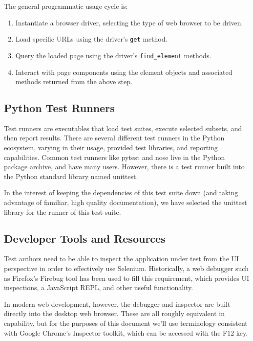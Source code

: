 The general programmatic usage cycle is:
\begin{enumerate}
\item Instantiate a browser driver, selecting the type of web browser to be driven.
\item Load specific URLs using the driver's \texttt{get} method.
\item Query the loaded page using the driver's \texttt{find\_element} methods.
\item Interact with page components using the element objects and associated methods returned from the above step.
\end{enumerate}\citep{artzi2011framework}

\subsection{Python Test Runners}
Test runners are executables that load test suites, execute selected subsets, and then report results. There are several different test runners in the Python ecosystem, varying in their usage, provided test libraries, and reporting capabilities. \citep{nielsen2014python} Common test runners like pytest and nose live in the Python package archive, and have many users. However, there is a test runner built into the Python standard library named unittest.\citep{pajankar2017python}

In the interest of keeping the dependencies of this test suite down (and taking advantage of familiar, high quality documentation), we have selected the unittest library for the runner of this test suite.

\subsection{Developer Tools and Resources}
Test authors need to be able to inspect the application under test from the UI perspective in order to effectively use Selenium. Historically, a web debugger such as Firefox's Firebug tool has been used to fill this requirement, which provides UI inspections, a JavaScript REPL, and other useful functionality.\citep{nicholus2016understanding}

In modern web development, however, the debugger and inspector are built directly into the desktop web browser.\citep{odell2014browser} These are all roughly equivalent in capability, but for the purposes of this document we'll use terminology consistent with Google Chrome's Inspector toolkit, which can be accessed with the F12 key.

